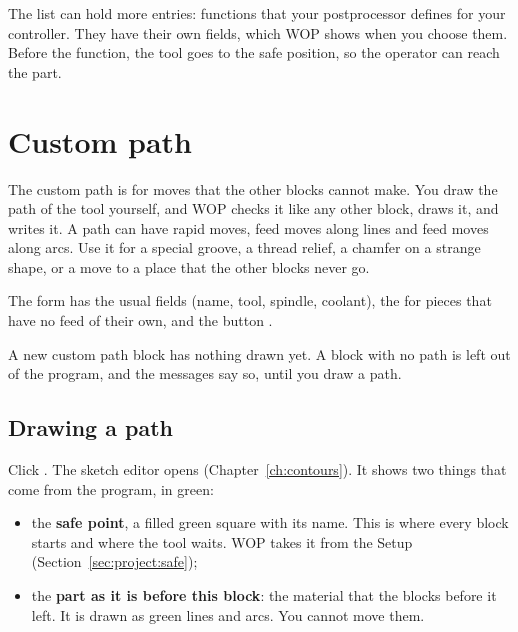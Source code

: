 The list can hold more entries: functions that your postprocessor defines for your controller. They have their own fields, which WOP shows when you choose them. Before the function, the tool goes to the safe position, so the operator can reach the part.

\section{Custom path}\label{sec:blocks:path}


The custom path is for moves that the other blocks cannot make. You draw the path of the tool yourself, and WOP checks it like any other block, draws it, and writes it. A path can have rapid moves, feed moves along lines and feed moves along arcs. Use it for a special groove, a thread relief, a chamfer on a strange shape, or a move to a place that the other blocks never go.

The form has the usual fields (name, tool, spindle, coolant), the  for pieces that have no feed of their own, and the button .

A new custom path block has nothing drawn yet. A block with no path is left out of the program, and the messages say so, until you draw a path.

\subsection{Drawing a path}
Click . The sketch editor opens (Chapter~\ref{ch:contours}). It shows two things that come from the program, in green:

\begin{itemize}
\item the \textbf{safe point}, a filled green square with its name. This is where every block starts and where the tool waits. WOP takes it from the Setup (Section~\ref{sec:project:safe});
\item the \textbf{part as it is before this block}: the material that the blocks before it left. It is drawn as green lines and arcs. You cannot move them.
\end{itemize}



